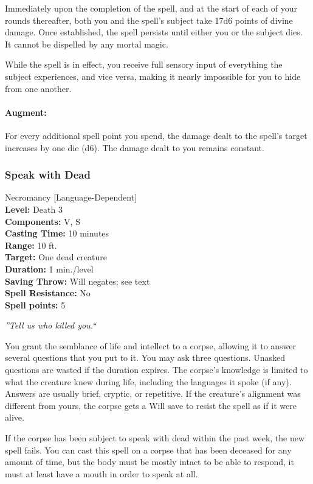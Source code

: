 Immediately upon the completion of the spell, and at the start of each of your rounds thereafter, both you and the spell's subject take 17d6 points of divine damage.
Once established, the spell persists until either you or the subject dies. It cannot be dispelled by any mortal magic.

While the spell is in effect, you receive full sensory input of everything the subject experiences, and vice versa, making it nearly impossible for you to hide from one another.

\paragraph{Augment:} For every additional spell point you spend, the damage dealt to the spell's target increases by one die (d6). The damage dealt to you remains constant.
\subsubsection{Speak with Dead}
\label{Spell:SpeakWithDead}
Necromancy [Language-Dependent]
\\ \textbf{Level:} Death 3
\\ \textbf{Components:} V, S
\\ \textbf{Casting Time:} 10 minutes
\\ \textbf{Range:} 10 ft.
\\ \textbf{Target:} One dead creature
\\ \textbf{Duration:} 1 min./level
\\ \textbf{Saving Throw:} Will negates; see text
\\ \textbf{Spell Resistance:} No
\\ \textbf{Spell points:} 5

\emph{''Tell us who killed you.``}

You grant the semblance of life and intellect to a corpse, allowing it to answer several questions that you put to it. 
You may ask three questions. Unasked questions are wasted if the duration expires. 
The corpse's knowledge is limited to what the creature knew during life, including the languages it spoke (if any). 
Answers are usually brief, cryptic, or repetitive. If the creature's alignment was different from yours, the corpse gets a Will save to resist the spell as if it were alive.

If the corpse has been subject to speak with dead within the past week, the new spell fails. 
You can cast this spell on a corpse that has been deceased for any amount of time, but the body must be mostly intact to be able to respond, it must at least have a mouth in order to speak at all.

